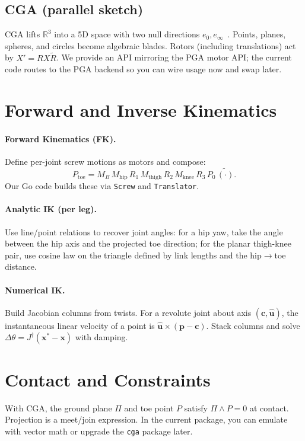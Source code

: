 \documentclass[11pt]{article}
\begin{document}
\subsection{CGA (parallel sketch)}
CGA lifts $\mathbb{R}^3$ into a 5D space with two null directions $e_0, e_\infty$~\cite{dorst2009gacs}.
Points, planes, spheres, and circles become algebraic blades. Rotors (including translations) act by $X' = R X \tilde{R}$.
We provide an API mirroring the PGA motor API; the current code routes to the PGA backend so you can wire usage now and swap later.

\section{Forward and Inverse Kinematics}
\paragraph{Forward Kinematics (FK).}
Define per-joint screw motions as motors and compose:
\[
P_{\text{toe}} = M_B\, M_{\text{hip}}\, R_1\, M_{\text{thigh}}\, R_2\, M_{\text{knee}}\, R_3\, P_0\, \widetilde{(\cdot)}.
\]
Our Go code builds these via \verb|Screw| and \verb|Translator|.

\paragraph{Analytic IK (per leg).}
Use line/point relations to recover joint angles: for a hip yaw, take the angle between the hip axis and the projected toe direction; for the planar thigh-knee pair, use cosine law on the triangle defined by link lengths and the hip$\rightarrow$toe distance.

\paragraph{Numerical IK.}
Build Jacobian columns from twists. For a revolute joint about axis $(\mathbf{c}, \hat{\mathbf{u}})$, the instantaneous linear velocity of a point is $ \hat{\mathbf{u}} \times (\mathbf{p} - \mathbf{c})$. Stack columns and solve $\Delta \theta = J^\dagger (\mathbf{x}^* - \mathbf{x})$ with damping.

\section{Contact and Constraints}
With CGA, the ground plane $\Pi$ and toe point $P$ satisfy $\Pi \wedge P = 0$ at contact.
Projection is a meet/join expression. In the current package, you can emulate with vector math or upgrade the \verb|cga| package later.
\end{document}
